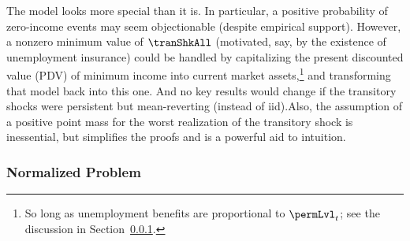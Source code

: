 \documentclass[BufferStockTheory]{subfiles}
\begin{document}
\hypertarget{PDV}{}

The model looks more special than it is.
In particular, a positive probability of zero-income events may seem objectionable (despite empirical support).
However, a nonzero minimum value of $\tranShkAll$ (motivated, say, by the existence of unemployment insurance) could be handled by capitalizing the present discounted value (PDV) of minimum income into current market assets,\footnote{So long as unemployment benefits are proportional to $\permLvl_{t}$; see the discussion in Section~\ref{subsubsec:ratio}.} and transforming that model back into this one.
And no key results would change if the transitory shocks were persistent but mean-reverting (instead of iid).\@ Also, the assumption of a positive point mass for the worst realization of the transitory shock is inessential, but simplifies the proofs and is a powerful aid to intuition.

\hypertarget{The-Problem-Can-Be-Rewritten-in-Ratio-Form}{}
\hypertarget{The-Problem-Can-Be-Normalized-By-Permanent-Income}{}
\subsubsection{Normalized Problem}\label{subsubsec:ratio}
\end{document}
